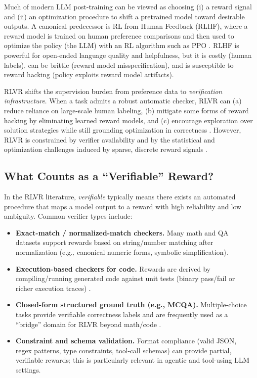 \documentclass[10pt]{article}
\begin{document}
Much of modern LLM post-training can be viewed as choosing (i) a reward signal and (ii) an optimization procedure to shift a pretrained model toward desirable outputs.
A canonical predecessor is RL from Human Feedback (RLHF), where a reward model is trained on human preference comparisons and then used to optimize the policy (the LLM) with an RL algorithm such as PPO \cite{christiano2017preferences,ziegler2019finetuning,stiennon2020summarize,ouyang2022instructgpt,schulman2017ppo}.
RLHF is powerful for open-ended language quality and helpfulness, but it is costly (human labels), can be brittle (reward model misspecification), and is susceptible to reward hacking (policy exploits reward model artifacts).

RLVR shifts the supervision burden from preference data to \emph{verification infrastructure}.
When a task admits a robust automatic checker, RLVR can (a) reduce reliance on large-scale human labeling, (b) mitigate some forms of reward hacking by eliminating learned reward models, and (c) encourage exploration over solution strategies while still grounding optimization in correctness \cite{guo2025deepseekr1,wen2025rlvr,cho2025safetycapability}.
However, RLVR is constrained by verifier availability and by the statistical and optimization challenges induced by sparse, discrete reward signals \cite{wei2025redit,wang2026verpo}.

\subsection{What Counts as a ``Verifiable'' Reward?}

In the RLVR literature, \emph{verifiable} typically means there exists an automated procedure that maps a model output to a reward with high reliability and low ambiguity.
Common verifier types include:

\begin{itemize}
  \item \textbf{Exact-match / normalized-match checkers.}
  Many math and QA datasets support rewards based on string/number matching after normalization (e.g., canonical numeric forms, symbolic simplification).
  \item \textbf{Execution-based checkers for code.}
  Rewards are derived by compiling/running generated code against unit tests (binary pass/fail or richer execution traces) \cite{le2022coderl,wang2026verpo}.
  \item \textbf{Closed-form structured ground truth (e.g., MCQA).}
  Multiple-choice tasks provide verifiable correctness labels and are frequently used as a ``bridge'' domain for RLVR beyond math/code \cite{zhang2025medrlvr}.
  \item \textbf{Constraint and schema validation.}
  Format compliance (valid JSON, regex patterns, type constraints, tool-call schemas) can provide partial, verifiable rewards; this is particularly relevant in agentic and tool-using LLM settings.
\end{itemize}
\end{document}
